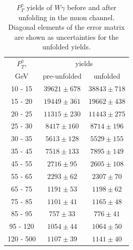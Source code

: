 \begin{table}[h]
  \scriptsize
  \begin{center}
  \caption{$P_T^{\gamma}$ yields of $W\gamma$ before and after unfolding in the muon channel. Diagonal elements of the error matrix are shown as uncertainties for the unfolded yields.}
  \begin{tabular}{|c|c|c|}

  $P_T^{\gamma}$, &  \multicolumn{2}{|c|}{yields} \\ 
  GeV           & pre-unfolded &  unfolded  \\ \hline

 10 -  15 &     $39621 \pm 678$ &     $38843 \pm 718$  \\ \hline
 15 -  20 &     $19449 \pm 361$ &     $19662 \pm 438$  \\ \hline
 20 -  25 &     $11315 \pm 230$ &     $11443 \pm 275$  \\ \hline
 25 -  30 &     $8417 \pm 160$ &     $8714 \pm 196$  \\ \hline
 30 -  35 &     $5613 \pm 128$ &     $5529 \pm 155$  \\ \hline
 35 -  45 &     $7518 \pm 133$ &     $7895 \pm 149$  \\ \hline
 45 -  55 &     $2716 \pm  95$ &     $2605 \pm 108$  \\ \hline
 55 -  65 &     $2293 \pm  62$ &     $2307 \pm  70$  \\ \hline
 65 -  75 &     $1191 \pm  53$ &     $1198 \pm  62$  \\ \hline
 75 -  85 &     $1101 \pm  41$ &     $1165 \pm  48$  \\ \hline
 85 -  95 &     $757 \pm  33$ &     $776 \pm  41$  \\ \hline
 95 - 120 &     $1054 \pm  44$ &     $1064 \pm  50$  \\ \hline
120 - 500 &     $1107 \pm  39$ &     $1141 \pm  40$  \\ \hline
  \end{tabular}
  \label{tab:unf_results_MUON_WGamma}
  \end{center}
\end{table}

